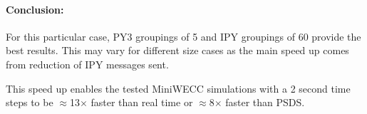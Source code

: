 \documentclass[12pt]{article}
\begin{document}
\paragraph{Conclusion:}
For this particular case, PY3 groupings of 5 and IPY groupings of 60 provide the best results. This may vary for different size cases as the main speed up comes from reduction of IPY messages sent.

This speed up enables the tested MiniWECC simulations with a 2 second time steps to be $\approx$13$\times$ faster than real time or $\approx$8$\times$ faster than PSDS.
\end{document}
